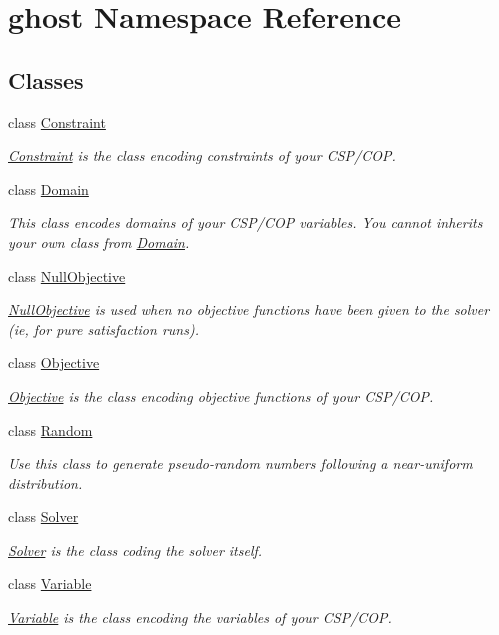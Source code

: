 \hypertarget{namespaceghost}{}\section{ghost Namespace Reference}
\label{namespaceghost}
\subsection*{Classes}
\begin{DoxyCompactItemize}
\item 
class \hyperlink{classghost_1_1Constraint}{Constraint}
\begin{DoxyCompactList}\small\item\em \hyperlink{classghost_1_1Constraint}{Constraint} is the class encoding constraints of your C\+S\+P/\+C\+OP. \end{DoxyCompactList}\item 
class \hyperlink{classghost_1_1Domain}{Domain}
\begin{DoxyCompactList}\small\item\em This class encodes domains of your C\+S\+P/\+C\+OP variables. You cannot inherits your own class from \hyperlink{classghost_1_1Domain}{Domain}. \end{DoxyCompactList}\item 
class \hyperlink{classghost_1_1NullObjective}{Null\+Objective}
\begin{DoxyCompactList}\small\item\em \hyperlink{classghost_1_1NullObjective}{Null\+Objective} is used when no objective functions have been given to the solver (ie, for pure satisfaction runs). \end{DoxyCompactList}\item 
class \hyperlink{classghost_1_1Objective}{Objective}
\begin{DoxyCompactList}\small\item\em \hyperlink{classghost_1_1Objective}{Objective} is the class encoding objective functions of your C\+S\+P/\+C\+OP. \end{DoxyCompactList}\item 
class \hyperlink{classghost_1_1Random}{Random}
\begin{DoxyCompactList}\small\item\em Use this class to generate pseudo-\/random numbers following a near-\/uniform distribution. \end{DoxyCompactList}\item 
class \hyperlink{classghost_1_1Solver}{Solver}
\begin{DoxyCompactList}\small\item\em \hyperlink{classghost_1_1Solver}{Solver} is the class coding the solver itself. \end{DoxyCompactList}\item 
class \hyperlink{classghost_1_1Variable}{Variable}
\begin{DoxyCompactList}\small\item\em \hyperlink{classghost_1_1Variable}{Variable} is the class encoding the variables of your C\+S\+P/\+C\+OP. \end{DoxyCompactList}\end{DoxyCompactItemize}
